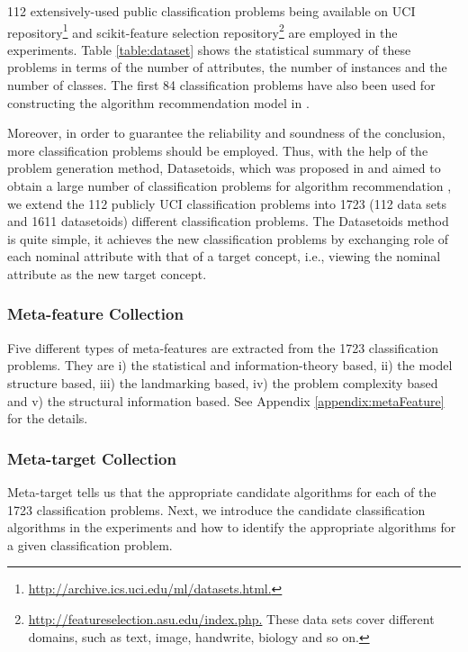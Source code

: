 \documentclass[acmsmall]{acmart}
\begin{document}
112 extensively-used public classification problems being available
on UCI
repository\footnote{\url{http://archive.ics.uci.edu/ml/datasets.html.}} and scikit-feature selection repository\footnote{\url{http://featureselection.asu.edu/index.php.} These data sets cover different domains, such as text, image, handwrite, biology and so on.}
are employed in the experiments. Table \ref{table:dataset} shows the
statistical summary of these problems in terms of the number of
attributes, the number of instances and the number of classes. The first 84
classification problems have also been used for constructing the
algorithm recommendation model in \cite{wang2014generic}.

Moreover, in order to guarantee the reliability and soundness of the
conclusion, more classification problems should be employed. Thus,
with the help of the problem generation method, Datasetoids, which
was proposed in \cite{soares2009uci} and aimed to obtain a large
number of classification problems for algorithm recommendation
\cite{prudencio2011selecting}, we extend the 112 publicly UCI
classification problems into 1723 (112 data sets and 1611
datasetoids) different classification problems. The Datasetoids
method is quite simple, it achieves the new classification problems
by exchanging role of each nominal attribute with that of a target
concept, i.e., viewing the nominal attribute as the new target
concept.

\subsubsection{Meta-feature Collection}

Five different types of meta-features are extracted from the 1723
classification problems. They are i) the statistical and
information-theory based, ii) the model structure based, iii) the
landmarking based, iv) the problem complexity based and v) the
structural information based. See Appendix \ref{appendix:metaFeature} for the details.

\subsubsection{Meta-target Collection}

Meta-target tells us that the appropriate candidate algorithms for
each of the 1723 classification problems. Next, we introduce the
candidate classification algorithms in the experiments and how to
identify the appropriate algorithms for a given classification
problem.
\end{document}
